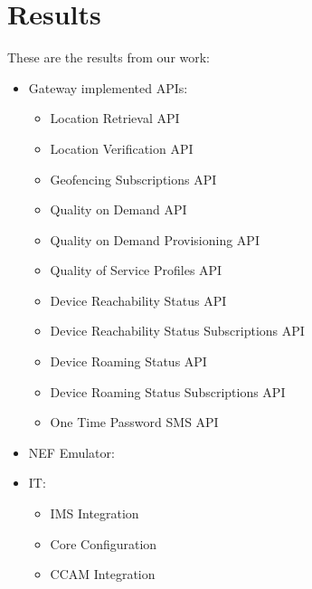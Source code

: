 \chapter{Results}

These are the results from our work:

\begin{itemize}
	\item Gateway implemented APIs:
	      \begin{itemize}
		      \item Location Retrieval API
		      \item Location Verification API
		      \item Geofencing Subscriptions API
		      \item Quality on Demand API
		      \item Quality on Demand Provisioning API
		      \item Quality of Service Profiles API
		      \item Device Reachability Status API
		      \item Device Reachability Status Subscriptions API
		      \item Device Roaming Status API
		      \item Device Roaming Status Subscriptions API
		      \item One Time Password SMS API
	      \end{itemize}

	\item NEF Emulator:
	\item IT:
	      \begin{itemize}
		      \item IMS Integration
		      \item Core Configuration
		      \item CCAM Integration
	      \end{itemize}

\end{itemize}
